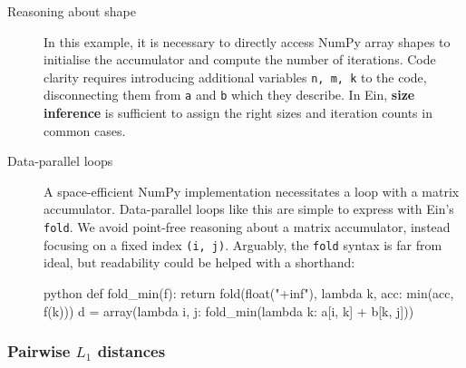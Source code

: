 \begin{description}
    \item[Reasoning about shape] In this example, it is necessary to directly access NumPy array shapes to initialise the accumulator and compute the number of iterations. Code clarity requires introducing additional variables \texttt{n, m, k} to the code, disconnecting them from \texttt{a} and \texttt{b} which they describe. In Ein, \textbf{size inference} is sufficient to assign the right sizes and iteration counts in common cases.
    \item[Data-parallel loops] A space-efficient NumPy implementation necessitates a loop with a matrix accumulator. 
    Data-parallel loops like this are simple to express with Ein's \texttt{fold}. We avoid point-free reasoning about a matrix accumulator, instead focusing on a fixed index \texttt{(i, j)}.
    Arguably, the \texttt{fold} syntax is far from ideal, but readability could be helped with a shorthand:
    \begin{center}        
    \begin{cminted}{python}
def fold_min(f):
    return fold(float("+inf"), lambda k, acc: min(acc, f(k)))
d = array(lambda i, j: fold_min(lambda k: a[i, k] + b[k, j]))
    \end{cminted}
    \end{center}
\end{description}

\subsubsection{Pairwise $L_1$ distances}

